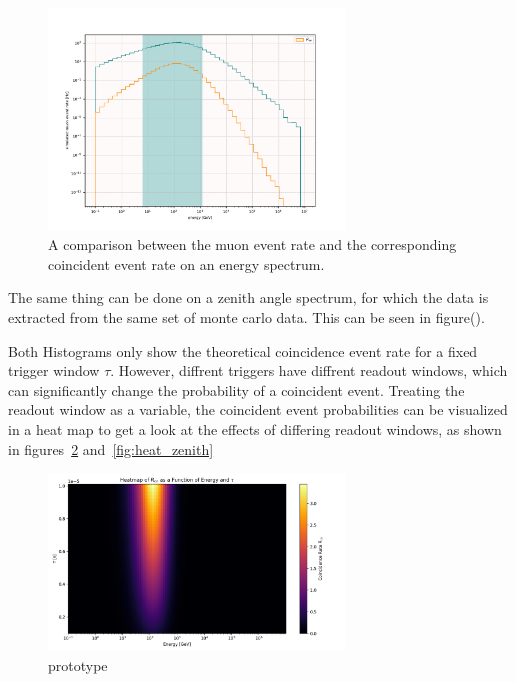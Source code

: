 \begin{figure}
    \centering
    \includegraphics[width=0.7\textwidth]{Plots/concidence_rate_energy.pdf}
    \caption{A comparison between the muon event rate and the corresponding coincident event rate on an energy spectrum.}
    \label{fig:coin_rate_comp}
\end{figure}

The same thing can be done on a zenith angle spectrum, for which the data is extracted from the same set of monte carlo data. This can be seen in figure().

    

Both Histograms only show the theoretical coincidence event rate for a fixed trigger window $\tau$. However, diffrent triggers have diffrent readout windows, which 
can significantly change the probability of a coincident event. Treating the readout window as a variable, the coincident event probabilities can be visualized in 
a heat map to get a look at the effects of differing readout windows, as shown in figures~\ref{fig:heat_energy} and~\ref{fig:heat_zenith} 

\begin{figure}
    \centering
    \includegraphics[width=0.7\textwidth]{Plots/heatmap_energy.png}
    \caption{prototype}
    \label{fig:heat_energy}
\end{figure}

